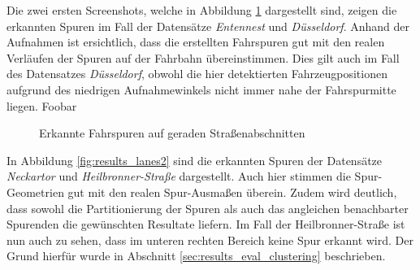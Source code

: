 Die zwei ersten Screenshots, welche in Abbildung \ref{fig:results_lanes1} dargestellt sind, zeigen die erkannten
Spuren im Fall der Datensätze \textit{Entennest} und \textit{Düsseldorf}.
Anhand der Aufnahmen ist ersichtlich, dass die erstellten Fahrspuren gut mit den realen Verläufen der
Spuren auf der Fahrbahn übereinstimmen.
Dies gilt auch im Fall des Datensatzes \textit{Düsseldorf}, obwohl die hier detektierten Fahrzeugpositionen
aufgrund des niedrigen Aufnahmewinkels nicht immer nahe der Fahrspurmitte liegen. Foobar

\begin{figure}[H]
    \centering
    \caption{Erkannte Fahrspuren auf geraden Straßenabschnitten}
    \label{fig:results_lanes1}
\end{figure}

In Abbildung \ref{fig:results_lanes2} sind die erkannten Spuren der Datensätze \textit{Neckartor} und \textit{Heilbronner-Straße}
dargestellt. Auch hier stimmen die Spur-Geometrien gut mit den realen Spur-Ausmaßen überein. Zudem wird deutlich,
dass sowohl die Partitionierung der Spuren als auch das angleichen benachbarter Spurenden die gewünschten Resultate liefern.
Im Fall der Heilbronner-Straße ist nun auch zu sehen, dass im unteren rechten Bereich keine Spur erkannt wird.
Der Grund hierfür wurde in Abschnitt \ref{sec:results_eval_clustering} beschrieben.

